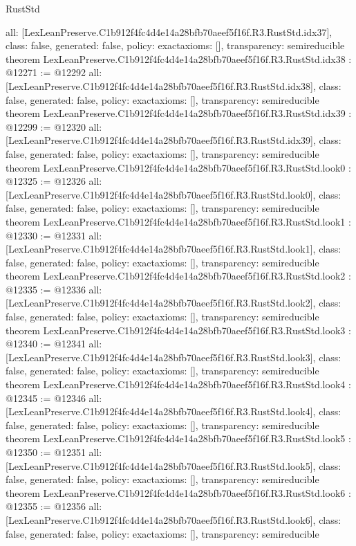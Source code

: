 \begin{lexlean}{RustStd}
\begin{coremodule}
{  all: [LexLeanPreserve.C1b912f4fc4d4e14a28bfb70aeef5f16f.R3.RustStd.idx37],
  class: false,
  generated: false,
  policy: exact{axioms: []},
  transparency: semireducible
}
theorem LexLeanPreserve.C1b912f4fc4d4e14a28bfb70aeef5f16f.R3.RustStd.idx38 : @12271 := @12292 {
  all: [LexLeanPreserve.C1b912f4fc4d4e14a28bfb70aeef5f16f.R3.RustStd.idx38],
  class: false,
  generated: false,
  policy: exact{axioms: []},
  transparency: semireducible
}
theorem LexLeanPreserve.C1b912f4fc4d4e14a28bfb70aeef5f16f.R3.RustStd.idx39 : @12299 := @12320 {
  all: [LexLeanPreserve.C1b912f4fc4d4e14a28bfb70aeef5f16f.R3.RustStd.idx39],
  class: false,
  generated: false,
  policy: exact{axioms: []},
  transparency: semireducible
}
theorem LexLeanPreserve.C1b912f4fc4d4e14a28bfb70aeef5f16f.R3.RustStd.look0 : @12325 := @12326 {
  all: [LexLeanPreserve.C1b912f4fc4d4e14a28bfb70aeef5f16f.R3.RustStd.look0],
  class: false,
  generated: false,
  policy: exact{axioms: []},
  transparency: semireducible
}
theorem LexLeanPreserve.C1b912f4fc4d4e14a28bfb70aeef5f16f.R3.RustStd.look1 : @12330 := @12331 {
  all: [LexLeanPreserve.C1b912f4fc4d4e14a28bfb70aeef5f16f.R3.RustStd.look1],
  class: false,
  generated: false,
  policy: exact{axioms: []},
  transparency: semireducible
}
theorem LexLeanPreserve.C1b912f4fc4d4e14a28bfb70aeef5f16f.R3.RustStd.look2 : @12335 := @12336 {
  all: [LexLeanPreserve.C1b912f4fc4d4e14a28bfb70aeef5f16f.R3.RustStd.look2],
  class: false,
  generated: false,
  policy: exact{axioms: []},
  transparency: semireducible
}
theorem LexLeanPreserve.C1b912f4fc4d4e14a28bfb70aeef5f16f.R3.RustStd.look3 : @12340 := @12341 {
  all: [LexLeanPreserve.C1b912f4fc4d4e14a28bfb70aeef5f16f.R3.RustStd.look3],
  class: false,
  generated: false,
  policy: exact{axioms: []},
  transparency: semireducible
}
theorem LexLeanPreserve.C1b912f4fc4d4e14a28bfb70aeef5f16f.R3.RustStd.look4 : @12345 := @12346 {
  all: [LexLeanPreserve.C1b912f4fc4d4e14a28bfb70aeef5f16f.R3.RustStd.look4],
  class: false,
  generated: false,
  policy: exact{axioms: []},
  transparency: semireducible
}
theorem LexLeanPreserve.C1b912f4fc4d4e14a28bfb70aeef5f16f.R3.RustStd.look5 : @12350 := @12351 {
  all: [LexLeanPreserve.C1b912f4fc4d4e14a28bfb70aeef5f16f.R3.RustStd.look5],
  class: false,
  generated: false,
  policy: exact{axioms: []},
  transparency: semireducible
}
theorem LexLeanPreserve.C1b912f4fc4d4e14a28bfb70aeef5f16f.R3.RustStd.look6 : @12355 := @12356 {
  all: [LexLeanPreserve.C1b912f4fc4d4e14a28bfb70aeef5f16f.R3.RustStd.look6],
  class: false,
  generated: false,
  policy: exact{axioms: []},
  transparency: semireducible
}
\end{coremodule}
\end{lexlean}
